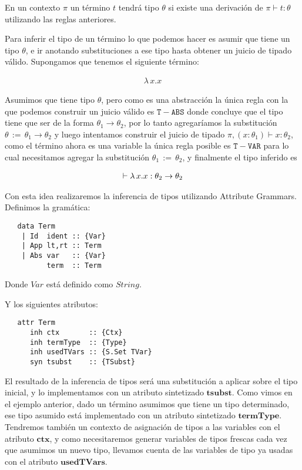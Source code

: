 \documentclass[a4paper,10pt]{article}
\newcommand{\typejud}[3] {
  \ensuremath{#1 \vdash #2 : #3}
}
\begin{document}
 En un contexto $\pi$ un término $t$ tendrá tipo $\theta$ si existe una derivación de
 $\typejud{\pi}{t}{\theta}$ utilizando las reglas anteriores.
 
 Para inferir el tipo de un término lo que podemos hacer es asumir que tiene un tipo $\theta$, e ir anotando
 substituciones a ese tipo hasta obtener un juicio de tipado válido. Supongamos que tenemos el siguiente término:
 
 \begin{align*}
    \lambda\,x.x
 \end{align*}

  Asumimos que tiene tipo $\theta$, pero como es una abstracción la única regla con la que podemos construir un juicio
  válido es $\mathtt{T-ABS}$ donde concluye que el tipo tiene que ser de la forma $\theta_1 \rightarrow \theta_2$, 
  por lo tanto agregaríamos la substitución $\theta\,:=\,\theta_1 \rightarrow \theta_2$ y luego
  intentamos construir el juicio de tipado $\typejud{\pi,(x:\theta_1)}{x}{\theta_2}$, como el término ahora
  es una variable la única regla posible es $\mathtt{T-VAR}$ para lo cual necesitamos agregar
  la substitución $\theta_1\,:=\,\theta_2$, y finalmente el tipo inferido es
  
  \begin{align*}
   \typejud{\empty}{\lambda\,x.x}{\theta_2 \rightarrow \theta_2}
  \end{align*}

  Con esta idea realizaremos la inferencia de tipos utilizando Attribute Grammars. Definimos la gramática:
  
  \begin{lstlisting}
   data Term
	| Id  ident :: {Var}
	| App lt,rt :: Term
	| Abs var   :: {Var}
	      term  :: Term
  \end{lstlisting}

  Donde $Var$ está definido como $String$.
  
  Y los siguientes atributos:
  
  \begin{lstlisting}
   attr Term 
      inh ctx       :: {Ctx}
      inh termType  :: {Type}
      inh usedTVars :: {S.Set TVar}
      syn tsubst    :: {TSubst}
  \end{lstlisting}

  El resultado de la inferencia de tipos será una substitución a aplicar sobre el tipo inicial, y lo implementamos con 
  un atributo sintetizado $\mathbf{tsubst}$. Como vimos en el ejemplo anterior, dado un término asumimos que tiene un 
  tipo determinado, ese tipo asumido está implementado con un atributo sintetizado $\mathbf{termType}$. Tendremos
  también un contexto de asignación de tipos a las variables con el atributo $\mathbf{ctx}$, y como necesitaremos generar
  variables de tipos frescas cada vez que asumimos un nuevo tipo, llevamos cuenta de las variables de tipo ya usadas
  con el atributo $\mathbf{usedTVars}$.
  
\end{document}
